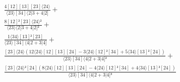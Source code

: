 \documentclass[varwidth, border=5pt]{standalone}
\begin{document}
\begin{my}
$\begin{gathered}
\scriptscriptstyle\frac{4[12][13][23]⟨24⟩}{⟨23⟩[34]⟨2|3+4|2]} +\\
\scriptscriptstyle\frac{8[12]²[23]⟨24⟩²}{⟨23⟩⟨2|3+4|2]²} +\\
\scriptscriptstyle\frac{1⟨34⟩[13]²[23]}{⟨23⟩[34]⟨4|2+3|4]} +\\
\scriptscriptstyle\frac{[23]⟨24⟩(12⟨24⟩[12][13][24]-3⟨24⟩[12]²[34]+5⟨34⟩[13]²[24])}{⟨23⟩[34]⟨4|2+3|4]²} +\\
\scriptscriptstyle\frac{[23]⟨24⟩²[24](8⟨24⟩[12][13][24]-4⟨24⟩[12]²[34]+4⟨34⟩[13]²[24])}{⟨23⟩[34]⟨4|2+3|4]³} \phantom{+}
\end{gathered}$
\end{my}
\end{document}
